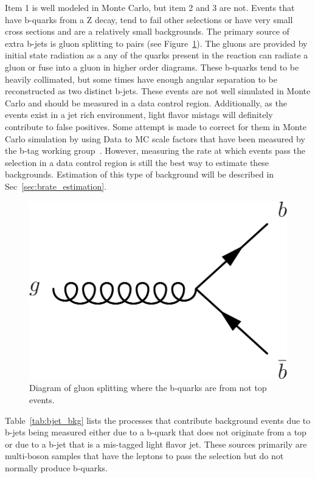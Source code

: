 Item 1 is well modeled in Monte Carlo, but item 2 and 3 are not. Events that have b-quarks from a Z decay, tend to fail other selections or have very small cross sections and are a relatively small backgrounds. The primary source of extra b-jets is gluon splitting to \bbbar pairs (see Figure~\ref{fig:gluon_splitting}). The gluons are provided by initial state radiation as a any of the quarks present in the reaction can radiate a gluon or fuse into a gluon in higher order diagrams. These b-quarks tend to be heavily collimated, but some times have enough angular separation to be reconstructed as two distinct b-jets. These events are not well simulated in Monte Carlo and should be measured in a data control region. Additionally, as the \ttZ events exist in a jet rich environment, light flavor mistags will definitely contribute to false positives. Some attempt is made to correct for them in Monte Carlo simulation by using Data to MC scale factors that have been measured by the b-tag working group~\cite{BTV11003}. However, measuring the rate at which events pass the selection in a data control region is still the best way to estimate these backgrounds. Estimation of this type of background will be described in Sec~\ref{sec:brate_estimation}. \\

			\begin{figure}[h]
\begin{center}
\includegraphics[width=0.48\linewidth]{Figs/gluon_splitting.pdf}
\caption{\label{fig:gluon_splitting}
Diagram of gluon splitting where the b-quarks are from not top events.
}
\end{center}
\end{figure} 


		Table~\ref{tab:bjet_bkg} lists the processes that contribute background events due to b-jets being measured either due to a b-quark that does not originate from a top or due to a b-jet that is a mis-tagged light flavor jet. These sources primarily are multi-boson samples that have the leptons to pass the selection but do not normally produce b-quarks.

